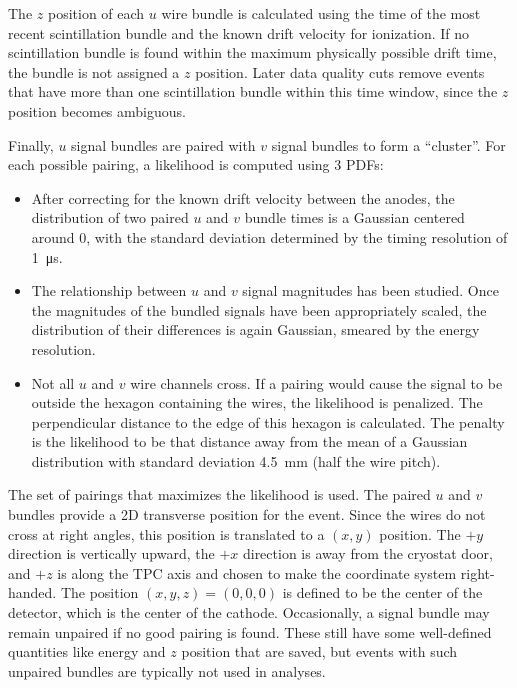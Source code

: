 \documentclass[herrin-thesis.tex]{subfiles}
\begin{document}
The \(z\) position of each \(u\) wire bundle is calculated using the time of the most recent scintillation bundle and the known drift velocity for ionization. If no scintillation bundle is found within the maximum physically possible drift time, the bundle is not assigned a \(z\) position. Later data quality cuts remove events that have more than one scintillation bundle within this time window, since the \(z\) position becomes ambiguous.

Finally, \(u\) signal bundles are paired with \(v\) signal bundles to form a ``cluster''. For each possible pairing, a likelihood is computed using 3 PDFs:
\begin{itemize}
\item After correcting for the known drift velocity between the anodes, the distribution of two paired \(u\) and \(v\) bundle times is a Gaussian centered around 0, with the standard deviation determined by the timing resolution of \SI{1}{\micro\s}.
\item The relationship between \(u\) and \(v\) signal magnitudes has been studied. Once the magnitudes of the bundled signals have been appropriately scaled, the distribution of their differences is again Gaussian, smeared by the energy resolution.
\item Not all \(u\) and \(v\) wire channels cross. If a pairing would cause the signal to be outside the hexagon containing the wires, the likelihood is penalized. The perpendicular distance to the edge of this hexagon is calculated. The penalty is the likelihood to be that distance away from the mean of a Gaussian distribution with standard deviation \SI{4.5}{\mm} (half the wire pitch).
\end{itemize}

The set of pairings that maximizes the likelihood is used. The paired \(u\) and \(v\) bundles provide a 2D transverse position for the event. Since the wires do not cross at right angles, this position is translated to a \((x, y)\) position. The \(+y\) direction is vertically upward, the \(+x\) direction is away from the cryostat door, and \(+z\) is along the TPC axis and chosen to make the coordinate system right-handed. The position \((x, y, z) = (0, 0, 0)\) is defined to be the center of the detector, which is the center of the cathode. Occasionally, a signal bundle may remain unpaired if no good pairing is found. These still have some well-defined quantities like energy and \(z\) position that are saved, but events with such unpaired bundles are typically not used in analyses.
\end{document}
